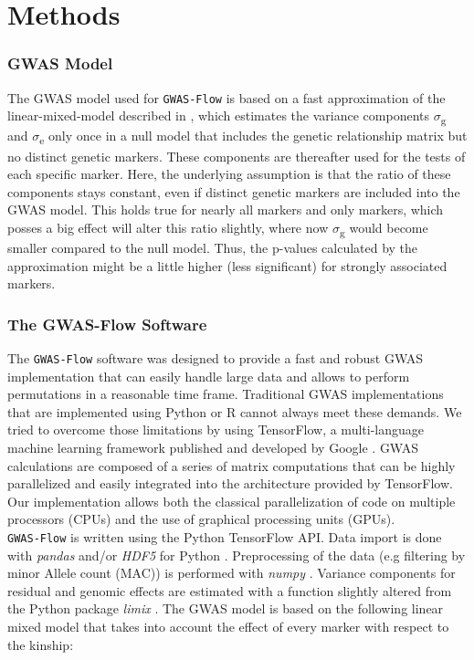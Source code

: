 \section{Methods}

\subsubsection{GWAS Model}
The GWAS model used for \texttt{GWAS-Flow} is based on a fast approximation of the
linear-mixed-model described in \cite{kang2010variance,Zhang2010}, which estimates the
variance components $\sigma$\textsubscript{g} and $\sigma$\textsubscript{e} only once in a
null model that includes the genetic relationship matrix but no distinct genetic
markers. These components are thereafter used for the tests of each specific marker. Here,
the underlying assumption is that the ratio of these components stays constant, even if
distinct genetic markers are included into the GWAS model. This holds true for nearly all
markers and only markers, which posses a big effect will alter this ratio slightly, where
now $\sigma$\textsubscript{g} would become smaller compared to the null model. Thus, the
p-values calculated by the approximation might be a little higher (less significant) for
strongly associated markers.

\subsubsection{The GWAS-Flow Software}
The \texttt{GWAS-Flow} software was designed to provide a fast and robust GWAS
implementation that can easily handle large data and allows to perform permutations in a
reasonable time frame. Traditional GWAS implementations that are implemented using Python
\cite{van1995python} or R \cite{R} cannot always meet these demands. We tried to overcome
those limitations by using TensorFlow, a multi-language machine learning framework
published and developed by Google \cite{tensorflow2015-whitepaper}. GWAS calculations are
composed of a series of matrix computations that can be highly parallelized and easily
integrated into the architecture provided by TensorFlow. Our implementation allows both
the classical parallelization of code on multiple processors (CPUs) and the use of
graphical processing units (GPUs).\\
\texttt{GWAS-Flow} is written using the Python TensorFlow API. Data import is done with
\textit{pandas} \cite{mckinney-proc-scipy-2010} and/or \textit{HDF5} for Python
\cite{hdf5_2014}. Preprocessing of the data (e.g filtering by minor Allele count (MAC)) is
performed with \textit{numpy} \cite{oliphant2006guide}. Variance components for residual
and genomic effects are estimated with a function slightly altered from the Python package
\textit{limix} \cite{Lippert003905}. The GWAS model is based on the following linear mixed
model that takes into account the effect of every marker with respect to the kinship:

